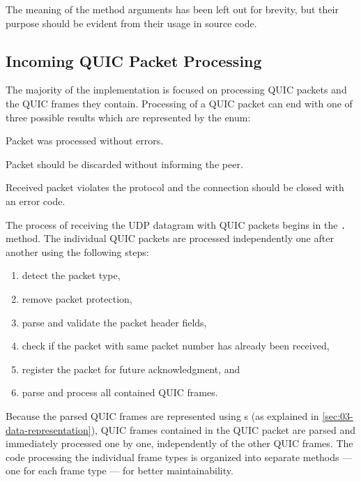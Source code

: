 The meaning of the method arguments has been left out for brevity, but their purpose should be
evident from their usage in source code.

\subsection{Incoming QUIC Packet Processing}

The majority of the \ManagedQuicConnection{} implementation is focused on processing QUIC packets
and the QUIC frames they contain. Processing of a QUIC packet can end with one of three possible
results which are represented by the \ProcessPacketResult{} enum:

\begin{itemize}

   Packet was processed without errors.

   Packet should be discarded without informing the peer.

   Received packet violates the protocol and the connection should be closed
with an error code.

\end{itemize}

The process of receiving the UDP datagram with QUIC packets begins in the
\texttt{\ManagedQuicConnection{}.} method. The individual QUIC packets are
processed independently one after another using the following steps:

\begin{enumerate}

  \item detect the packet type,

  \item remove packet protection,

  \item parse and validate the packet header fields,

  \item check if the packet with same packet number has already been received,

  \item register the packet for future acknowledgment, and

  \item parse and process all contained QUIC frames.

\end{enumerate}

Because the parsed QUIC frames are represented using s (as explained in
\autoref{sec:03-data-representation}), QUIC frames contained in the QUIC packet are parsed and
immediately processed one by one, independently of the other QUIC frames. The code processing the
individual frame types is organized into separate methods --- one for each frame type --- for better
maintainability.

